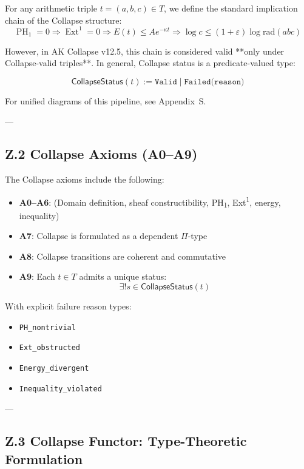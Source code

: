 \documentclass[11pt]{article}
\DeclareMathOperator{\Ext}{Ext}
\DeclareMathOperator{\PH}{PH}
\begin{document}
For any arithmetic triple \( t = (a,b,c) \in T \), we define the standard implication chain of the Collapse structure:
\[
\boxed{
\PH_1 = 0 \Rightarrow \Ext^1 = 0 \Rightarrow E(t) \leq Ae^{-\kappa t} \Rightarrow \log c \leq (1+\varepsilon)\log \mathrm{rad}(abc)
}
\]

However, in AK Collapse v12.5, this chain is considered valid **only under Collapse-valid triples**.  
In general, Collapse status is a predicate-valued type:

\[
\mathsf{CollapseStatus}(t) := \texttt{Valid} \;|\; \texttt{Failed(reason)}
\]

For unified diagrams of this pipeline, see Appendix~S.

---

\subsection*{Z.2 Collapse Axioms (A0--A9)}

The Collapse axioms include the following:

\begin{itemize}
  \item \textbf{A0--A6}: (Domain definition, sheaf constructibility, PH\textsubscript{1}, Ext\textsuperscript{1}, energy, inequality)
  \item \textbf{A7}: Collapse is formulated as a dependent \( \Pi \)-type
  \item \textbf{A8}: Collapse transitions are coherent and commutative
  \item \textbf{A9}: Each \( t \in T \) admits a unique status:  
  \[
  \exists! s \in \mathsf{CollapseStatus}(t)
  \]
\end{itemize}

With explicit failure reason types:
\begin{itemize}
  \item[] \texttt{PH\_nontrivial}
  \item[] \texttt{Ext\_obstructed}
  \item[] \texttt{Energy\_divergent}
  \item[] \texttt{Inequality\_violated}
\end{itemize}

---

\subsection*{Z.3 Collapse Functor: Type-Theoretic Formulation}
\end{document}

